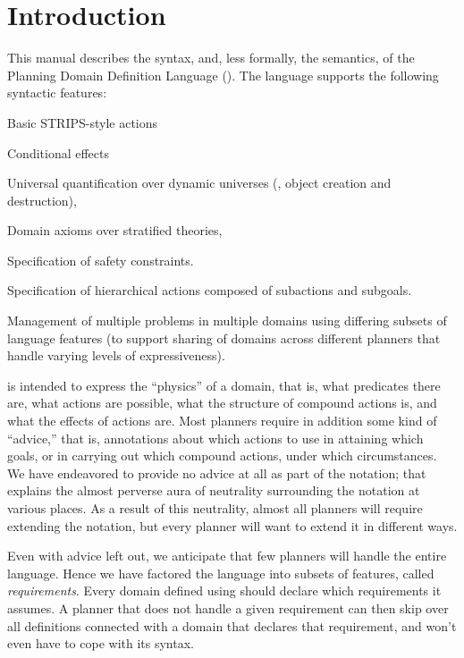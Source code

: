 \newpage

\pagestyle{plain}

{}

\section{Introduction}
\label{intro}


This manual describes the syntax, and, less formally, the semantics,
of the Planning Domain Definition Language (\lang). 
The language supports the following syntactic
features: 


\bi
    \item Basic STRIPS-style actions
    \item Conditional effects
    \item Universal quantification over dynamic universes (\ie, object
       creation and destruction), 
    \item Domain axioms over stratified theories,  
    \item Specification of safety constraints. 
    \item Specification of hierarchical actions composed of subactions and subgoals.
    \item Management of multiple problems in multiple domains using
    differing subsets of language features (to support sharing of domains
    across different planners that handle varying levels of expressiveness). 
\ei

\lang{} is intended to express the ``physics'' of a domain, that is, what
predicates there are, what
actions are possible, what the structure of compound actions is, and what the
effects of actions are.  Most planners require in addition some kind of
``advice,'' that is, annotations about which actions to use in attaining which
goals, or in carrying out which compound actions,  under which circumstances.
We have endeavored to provide no advice at all as part of the \lang{}
notation; that explains the almost perverse aura of neutrality
surrounding the notation at various places. 
As a result of this neutrality,
almost all planners will require extending the notation, but every 
planner will want to extend it in different ways.

Even with advice left out,
we anticipate that few planners will handle the entire \lang{}
language.  Hence we have factored the language into subsets of
features, called {\em requirements}.  Every domain defined using
\lang{} should declare which requirements it assumes.  A planner that
does not handle a given requirement can then skip over all definitions
connected with a domain that declares that requirement, and won't even
have to cope with its syntax.  

